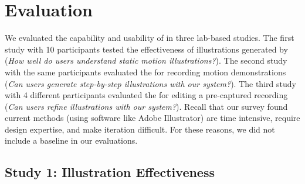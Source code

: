 
\section{Evaluation}
We evaluated the capability and usability of \systemname{} in three lab-based studies.
%
The first study with 10 participants tested the effectiveness of illustrations generated by \systemname{} (\emph{How well do users understand static motion illustrations?}).
%
The second study with the same participants evaluated the \phaseI{} for recording motion demonstrations (\emph{Can users generate step-by-step illustrations with our system?}).
%
The third study with 4 different participants evaluated the \phaseII{} for editing a pre-captured recording (\emph{Can users refine illustrations with our system?}).
%
Recall that our survey found current methods (using software like Adobe Illustrator) are time intensive, require design expertise, and make iteration difficult.
For these reasons, we did not include a baseline in our evaluations.


\subsection{Study 1: Illustration Effectiveness}

